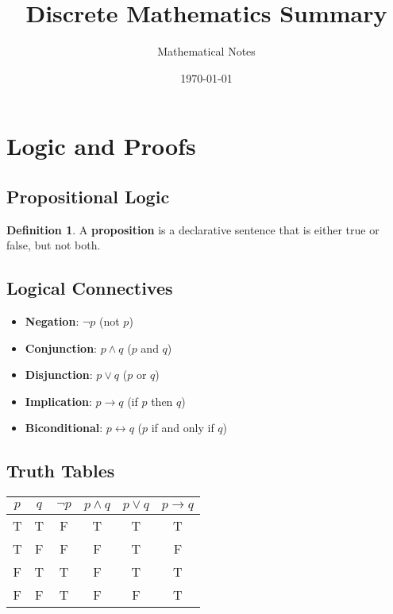 \documentclass[11pt]{article}
\title{Discrete Mathematics Summary}
\author{Mathematical Notes}
\date{\today}
\theoremstyle{definition}
\newtheorem{definition}{Definition}[section]
\begin{document}
\maketitle

\tableofcontents
\newpage

\section{Logic and Proofs}

\subsection{Propositional Logic}

\begin{definition}
A \textbf{proposition} is a declarative sentence that is either true or false, but not both.
\end{definition}

\subsection{Logical Connectives}
\begin{itemize}
    \item \textbf{Negation}: $\neg p$ (not $p$)
    \item \textbf{Conjunction}: $p \land q$ ($p$ and $q$)
    \item \textbf{Disjunction}: $p \lor q$ ($p$ or $q$)
    \item \textbf{Implication}: $p \rightarrow q$ (if $p$ then $q$)
    \item \textbf{Biconditional}: $p \leftrightarrow q$ ($p$ if and only if $q$)
\end{itemize}

\subsection{Truth Tables}
\begin{center}
\begin{tabular}{|c|c|c|c|c|c|}
\hline
$p$ & $q$ & $\neg p$ & $p \land q$ & $p \lor q$ & $p \rightarrow q$ \\
\hline
T & T & F & T & T & T \\
T & F & F & F & T & F \\
F & T & T & F & T & T \\
F & F & T & F & F & T \\
\hline
\end{tabular}
\end{center}
\end{document}

